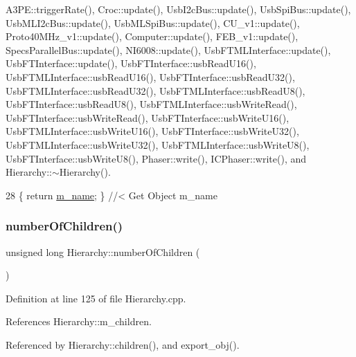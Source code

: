 A3\+P\+E\+::trigger\+Rate(), Croc\+::update(), Usb\+I2c\+Bus\+::update(), Usb\+Spi\+Bus\+::update(), Usb\+M\+L\+I2c\+Bus\+::update(), Usb\+M\+L\+Spi\+Bus\+::update(), C\+U\+\_\+v1\+::update(), Proto40\+M\+Hz\+\_\+v1\+::update(), Computer\+::update(), F\+E\+B\+\_\+v1\+::update(), Specs\+Parallel\+Bus\+::update(), N\+I6008\+::update(), Usb\+F\+T\+M\+L\+Interface\+::update(), Usb\+F\+T\+Interface\+::update(), Usb\+F\+T\+Interface\+::usb\+Read\+U16(), Usb\+F\+T\+M\+L\+Interface\+::usb\+Read\+U16(), Usb\+F\+T\+Interface\+::usb\+Read\+U32(), Usb\+F\+T\+M\+L\+Interface\+::usb\+Read\+U32(), Usb\+F\+T\+M\+L\+Interface\+::usb\+Read\+U8(), Usb\+F\+T\+Interface\+::usb\+Read\+U8(), Usb\+F\+T\+M\+L\+Interface\+::usb\+Write\+Read(), Usb\+F\+T\+Interface\+::usb\+Write\+Read(), Usb\+F\+T\+Interface\+::usb\+Write\+U16(), Usb\+F\+T\+M\+L\+Interface\+::usb\+Write\+U16(), Usb\+F\+T\+Interface\+::usb\+Write\+U32(), Usb\+F\+T\+M\+L\+Interface\+::usb\+Write\+U32(), Usb\+F\+T\+M\+L\+Interface\+::usb\+Write\+U8(), Usb\+F\+T\+Interface\+::usb\+Write\+U8(), Phaser\+::write(), I\+C\+Phaser\+::write(), and Hierarchy\+::$\sim$\+Hierarchy().


\begin{DoxyCode}
28 \{ \textcolor{keywordflow}{return} \hyperlink{classObject_a8b83c95c705d2c3ba0d081fe1710f48d}{m\_name}; \} \textcolor{comment}{//< Get Object m\_name}
\end{DoxyCode}
\mbox{\label{classHierarchy_ab16e84de65fd84e14001a6cf941c8be4}} 
\subsubsection{\texorpdfstring{number\+Of\+Children()}{numberOfChildren()}}
{\footnotesize\ttfamily unsigned long Hierarchy\+::number\+Of\+Children (\begin{DoxyParamCaption}{ }\end{DoxyParamCaption})\hspace{0.3cm}{\ttfamily [inherited]}}



Definition at line 125 of file Hierarchy.\+cpp.



References Hierarchy\+::m\+\_\+children.



Referenced by Hierarchy\+::children(), and export\+\_\+obj().


